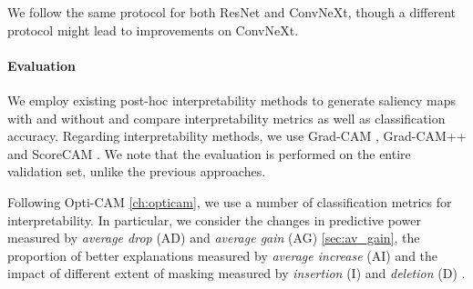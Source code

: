 We follow the same protocol for both ResNet and ConvNeXt, though a different protocol might lead to improvements on ConvNeXt.


\paragraph{Evaluation}
We employ existing post-hoc interpretability methods to generate saliency maps with and without 
\Ours and compare interpretability metrics as well as classification accuracy. Regarding 
interpretability methods, we use Grad-CAM \autocite{selvaraju2017grad}, 
Grad-CAM++ \autocite{chattopadhay2018grad} and ScoreCAM \autocite{wang2020score}. We note that the 
evaluation is performed on the entire validation set, unlike the previous approaches.

Following Opti-CAM \ref{ch:opticam}, we use a number of classification metrics for interpretability. 
In particular, we consider the changes in predictive power measured by \emph{average drop} 
(AD) \autocite{chattopadhay2018grad} and \emph{average gain} (AG) \autoref{sec:av_gain}, the 
proportion of better explanations measured by \emph{average increase} (AI) 
\autocite{chattopadhay2018grad} and the impact of different extent of masking measured by 
\emph{insertion} (I) and \emph{deletion} (D) \autocite{petsiuk2018rise}.




